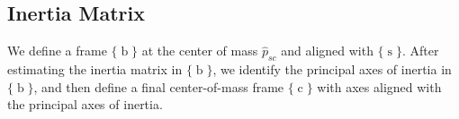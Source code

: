 \documentclass[letterpaper, 10 pt, journal, twoside]{IEEEtran}
\newcommand{\wrench}{{\mathcal F}}
\newcommand{\twist}{{\mathcal V}}
\newcommand{\mass}{{\mathfrak{m}}}
\newcommand{\frames}{\operatorname{s}}
\newcommand{\framec}{\operatorname{c}}
\newcommand{\frameb}{\operatorname{b}}
\begin{document}
\begin{comment}
Combining Equation~\eqref{eqn:com1} and~\eqref{eqn:com2} gives us
\begin{equation}
    [\alpha_{sk}] p_{s0} + [\omega_{sk}]^2 p_{s0} = \frac{1}{\mass}(\sum\limits_{i=1}^{N}R_{si}f_{ik}) - a_{sk}
.\end{equation}

In this relationship, the computation of the interested item $p_{s0}$ is out of the linear combination, therefore a regression matrix can be formed for least-square minimization as
\begin{equation}
A_{\text{reg}}_k = 
\begin{bmatrix}
 -w_y^2 - w_z^2 & -\alpha_z + w_x w_y & \alpha_y + w_x w_z \\
 \alpha_z + w_y^2 & -w_x^2 - w_z^2 & -\alpha_x + w_y w_z \\
 -\alpha_y + w_x w_z & \alpha_x + w_y w_z & -w_x^2 + w_y^2
\end{bmatrix}_{sk}
\end{equation}
so that
\begin{equation}
A_{\text{reg}}_k p_{s0} = \frac{1}{\mass}(\sum\limits_{i=1}^{N}R_{si}f_{ik}+R_{ss_0}f_g) - a_{sk}
\end{equation}

At this point, the mass of the object and the location of the CoM can be determined from any robot grasp frame.
\end{comment}
\subsection{Inertia Matrix}
\label{ssec:inertia}

We define a frame $\{\frameb\}$ at the center of mass $\hat{p}_{sc}$ and aligned with $\{\frames\}$. After estimating the inertia matrix in $\{\frameb\}$, we identify the principal axes of inertia in $\{\frameb\}$, and then define a final center-of-mass frame $\{\framec\}$ with axes aligned with the principal axes of inertia. 
\end{document}
